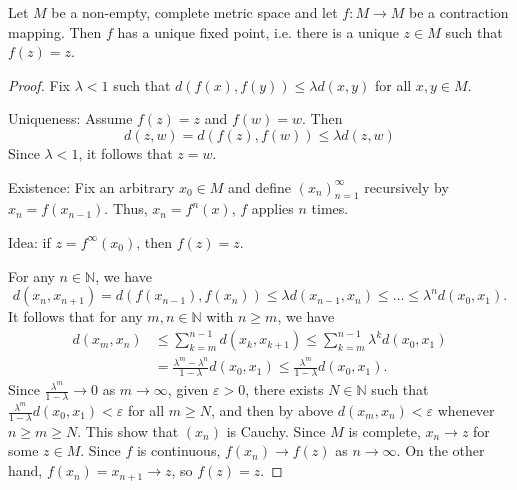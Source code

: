 \documentclass[a4paper,11pt]{article}
\begin{document}
\begin{theorem}
    Let $M$ be a non-empty, complete metric space and let $f: M \rightarrow M$ be a contraction mapping. Then $f$ has a unique fixed point, i.e. there is a unique $z \in M$ such that $f(z)=z$. 
\end{theorem}
\begin{proof}
    Fix $\lambda<1$ such that $d(f(x), f(y)) \leqslant \lambda d(x, y)$ for all $x, y \in M$.

    Uniqueness: Assume $f(z)=z$ and $f(w)=w$. Then
    \[
    d(z, w)=d(f(z), f(w)) \leqslant \lambda d(z, w)
    \]
    Since $\lambda<1$, it follows that $z=w$. 

    Existence: Fix an arbitrary $x_0 \in M$ and define $\left(x_n\right)_{n=1}^{\infty}$ recursively by $x_n=f\left(x_{n-1}\right)$. Thus, $x_n=f^n(x)$, $f$ applies $n$ times.

    Idea: if $z= f^{\infty}(x_0)$, then $f(z)=z$.

    For any $n \in \mathbb{N}$, we have
    \[
    d\left(x_n, x_{n+1}\right)=d\left(f\left(x_{n-1}\right), f\left(x_n\right)\right) \leqslant \lambda d\left(x_{n-1}, x_n\right) \leqslant \ldots \leqslant \lambda^n d\left(x_0, x_1\right).
    \]
    It follows that for any $m, n \in \mathbb{N}$ with $n \geqslant m$, we have
    \begin{align*}
        d\left(x_m, x_n\right) &\leqslant \sum_{k=m}^{n-1} d\left(x_k, x_{k+1}\right) \leqslant \sum_{k=m}^{n-1} \lambda^k d\left(x_0, x_1\right)\\ 
        &=\frac{\lambda^m-\lambda^n}{1-\lambda} d\left(x_0, x_1\right) \leqslant \frac{\lambda^m}{1-\lambda} d\left(x_0, x_1\right).
    \end{align*}
    Since $\frac{\lambda^m}{1-\lambda} \rightarrow 0$ as $m \rightarrow \infty$, given $\varepsilon>0$, there exists $N \in \mathbb{N}$ such that $\frac{\lambda^m}{1-\lambda} d\left(x_0, x_1\right)<\varepsilon$ for all $m \geqslant N$, and then by above $d\left(x_m, x_n\right)<\varepsilon$ whenever $n \geqslant m \geqslant N$. This show that $\left(x_n\right)$ is Cauchy. Since $M$ is complete, $x_n \rightarrow z$ for some $z \in M$.
    Since $f$ is continuous, $f\left(x_n\right) \rightarrow f(z)$ as $n \rightarrow \infty$. On the other hand, $f\left(x_n\right)=x_{n+1} \rightarrow z$, so $f(z)=z$.
\end{proof}
\end{document}
